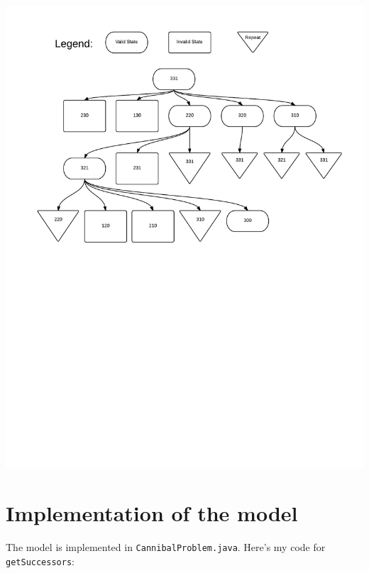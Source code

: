 \documentclass[a4paper]{report}
\begin{document}
\hspace*{-2in}
\includegraphics{drawing.pdf}


\section{Implementation of the model}
The model is implemented in 
\verb`CannibalProblem.java`.  Here's my code for \verb`getSuccessors`:
\end{document}
